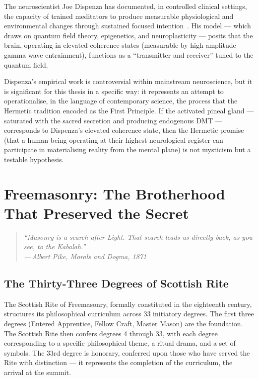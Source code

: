 \documentclass[12pt, a4paper]{article}
\newcommand{\epigraph}[2]{%
  \begin{quote}
    \itshape ``#1''\\[0.3em]
    \normalfont\small\hfill ---\,#2
  \end{quote}
}
\begin{document}
The neuroscientist Joe Dispenza has documented, in controlled clinical settings,
the capacity of trained meditators to produce measurable physiological and
environmental changes through sustained focused intention~\autocite{dispenza2017}.
His model — which draws on quantum field theory, epigenetics, and
neuroplasticity — posits that the brain, operating in elevated coherence states
(measurable by high-amplitude gamma wave entrainment), functions as a
``transmitter and receiver'' tuned to the quantum field.

Dispenza's empirical work is controversial within mainstream neuroscience, but
it is significant for this thesis in a specific way: it represents an attempt
to operationalise, in the language of contemporary science, the process that
the Hermetic tradition encoded as the First Principle. If the activated pineal
gland — saturated with the sacred secretion and producing endogenous DMT —
corresponds to Dispenza's elevated coherence state, then the Hermetic promise
(that a human being operating at their highest neurological register can
participate in materialising reality from the mental plane) is not mysticism
but a testable hypothesis.

\section{Freemasonry: The Brotherhood That Preserved the Secret}
\label{sec:freemasonry}

\epigraph{Masonry is a search after Light. That search leads us directly back,
as you see, to the Kabalah.}{Albert Pike, \emph{Morals and Dogma}, 1871}

\subsection{The Thirty-Three Degrees of Scottish Rite}

The Scottish Rite of Freemasonry, formally constituted in the eighteenth
century, structures its philosophical curriculum across 33 initiatory degrees.
The first three degrees (Entered Apprentice, Fellow Craft, Master Mason) are
the foundation. The Scottish Rite then confers degrees 4 through 33, with
each degree corresponding to a specific philosophical theme, a ritual drama,
and a set of symbols. The 33rd degree is honorary, conferred upon those who
have served the Rite with distinction — it represents the completion of the
curriculum, the arrival at the summit.
\end{document}
